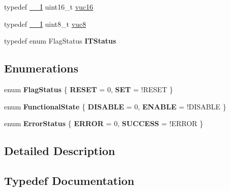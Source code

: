 \begin{DoxyCompactItemize}
\item 
typedef \hyperlink{group___c_m_s_i_s__core__definitions_gaf63697ed9952cc71e1225efe205f6cd3}{\+\_\+\+\_\+I} uint16\+\_\+t \hyperlink{group___exported__types_ga7f6037565f0caa27727c8b871daf0d56}{vuc16}
\item 
typedef \hyperlink{group___c_m_s_i_s__core__definitions_gaf63697ed9952cc71e1225efe205f6cd3}{\+\_\+\+\_\+I} uint8\+\_\+t \hyperlink{group___exported__types_gab0ec90ac9b2c5864755998c8d37c264a}{vuc8}
\item 
\mbox{\label{group___exported__types_gaacbd7ed539db0aacd973a0f6eca34074}} 
typedef enum Flag\+Status {\bfseries I\+T\+Status}
\end{DoxyCompactItemize}
\subsection*{Enumerations}
\begin{DoxyCompactItemize}
\item 
\mbox{\label{group___exported__types_ga89136caac2e14c55151f527ac02daaff}} 
enum {\bfseries Flag\+Status} \{ {\bfseries R\+E\+S\+ET} = 0, 
{\bfseries S\+ET} = !\+R\+E\+S\+ET
 \}
\item 
\mbox{\label{group___exported__types_gac9a7e9a35d2513ec15c3b537aaa4fba1}} 
enum {\bfseries Functional\+State} \{ {\bfseries D\+I\+S\+A\+B\+LE} = 0, 
{\bfseries E\+N\+A\+B\+LE} = !\+D\+I\+S\+A\+B\+LE
 \}
\item 
\mbox{\label{group___exported__types_ga8333b96c67f83cba354b3407fcbb6ee8}} 
enum {\bfseries Error\+Status} \{ {\bfseries E\+R\+R\+OR} = 0, 
{\bfseries S\+U\+C\+C\+E\+SS} = !\+E\+R\+R\+OR
 \}
\end{DoxyCompactItemize}


\subsection{Detailed Description}


\subsection{Typedef Documentation}
\mbox{\label{group___exported__types_gae9b1af5c037e57a98884758875d3a7c4}} 

